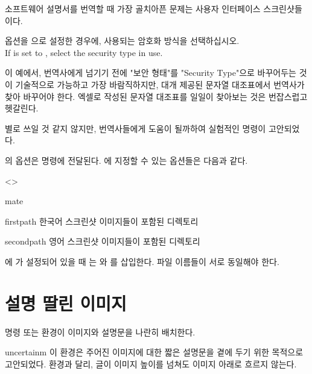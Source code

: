 \documentclass[pairquote, minted]{hzguide}
\begin{document}
소프트웨어 설명서를 번역할 때 가장 골치아픈 문제는 사용자 인터페이스 스크린샷들이다.

\begin{reference}
 옵션을 으로 설정한 경우에, 사용되는 암호화 방식을 선택하십시오. \\
If  is set to , select the security type in use.
\end{reference}

이 예에서, 번역사에게 넘기기 전에 "보안 형태"를 "Security Type"으로 바꾸어두는 것이 기술적으로 가능하고 가장 바람직하지만, 
대개 제공된 문자열 대조표에서 번역사가 찾아 바꾸어야 한다.
엑셀로 작성된 문자열 대조표를 일일이 찾아보는 것은 번잡스럽고 헷갈린다.

별로 쓰일 것 같지 않지만, 번역사들에게 도움이 될까하여 실험적인 \macro{\mateimage} 명령이 고안되었다.

\begin{code}
\end{code}

\macro{\mateimage}의 옵션은 \macro{\image} 명령에 전달된다.
\macro{\MateSetup}에 지정할 수 있는 옵션들은 다음과 같다.

\begin{macros}<\MateSetup>
\item[mate] 
\item[firstpath] 
한국어 스크린샷 이미지들이 포함된 디렉토리
\item[secondpath] 
영어 스크린샷 이미지들이 포함된 디렉토리
\end{macros}

에 가 설정되어 있을 때 는 와 를 삽입한다.
파일 이름들이 서로 동일해야 한다.

\section{설명 딸린 이미지}

\macro{\illustimage} 명령 또는  환경이 이미지와 설명문을 나란히 배치한다.

\begin{coderesult}
\begin{IllustImage}{uncertainm}
이 환경은 주어진 이미지에 대한 짧은 설명문을 곁에 두기 위한 목적으로 고안되었다.
 환경과 달리, 글이 이미지 높이를 넘쳐도 이미지 아래로 흐르지 않는다.
\end{IllustImage}
\end{coderesult}
\end{document}
